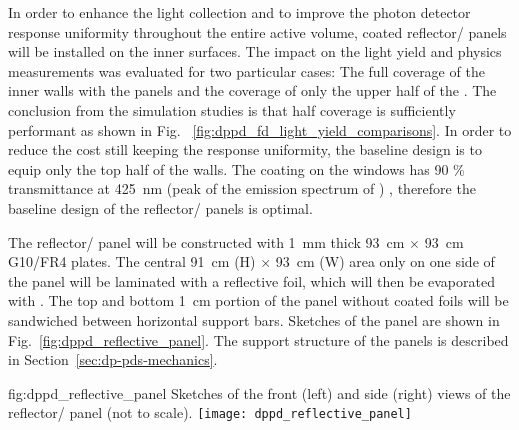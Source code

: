 In order to enhance the light collection and to improve the photon detector response uniformity throughout the entire  active volume,  coated reflector/ panels will be installed on the  inner surfaces. The impact on the light yield and physics measurements was evaluated for two particular cases: The full coverage of the  inner walls with the panels and the coverage of only the upper half of the . The conclusion from the simulation studies is that half coverage is sufficiently performant as shown in Fig. ~\ref{fig:dppd_fd_light_yield_comparisons}. In order to reduce the cost still keeping the  response uniformity, the baseline design is to equip only the top half of the  walls. The  coating on the  windows has \num{90} \% transmittance at \SI{425}{nm} (peak of the emission spectrum of ) \cite{Francini:2013lua}, therefore the baseline design of the reflector/ panels is optimal. 

The reflector/ panel will be constructed with \SI{1}{\mm} thick \SI{93}{\cm} $\times$ \SI{93}{\cm} G10/FR4 plates. The central \SI{91}{\cm} (H) $\times$ \SI{93}{\cm} (W) area only on one side of the panel will be laminated with a reflective foil, which will then be evaporated with . The top and bottom \SI{1}{\cm} portion of the panel without coated foils will be sandwiched between horizontal support bars. Sketches of the panel are shown in Fig.~\ref{fig:dppd_reflective_panel}. The support structure of the panels is described in Section~\ref{sec:dp-pds-mechanics}. 
\begin{dunefigure}{fig:dppd_reflective_panel}
{Sketches of the front (left) and side (right) views of the reflector/ panel (not to scale).}
\texttt{[image: dppd\_reflective\_panel]}
\end{dunefigure}

